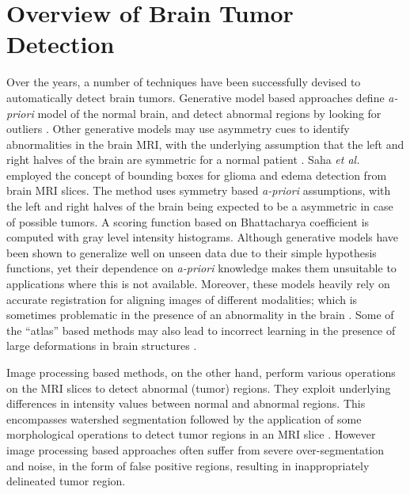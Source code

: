 \documentclass[journal,twocolumn]{IEEEtran}
\begin{document}
\section{Overview of Brain Tumor Detection}
\label{sec:previous_work}
Over the years, a number of techniques have been successfully devised to automatically detect brain tumors. Generative model based approaches define \emph{a-priori} model of the normal brain,  and detect abnormal regions by looking for outliers \cite{Prastawa2004_gen, Cuadra2004_atlas, Zacharaki2008_gen, Menze2010_gen}. Other generative models may use asymmetry cues to identify abnormalities in the brain MRI, with the underlying assumption that the left and right halves of the brain are symmetric for a normal patient \cite{Khotanlou2009_3d, Saha2012_quick}.
Saha \emph{et al.}  \cite{Saha2012_quick} employed the concept of bounding boxes for glioma and edema detection from brain MRI slices. The method uses symmetry based \emph{a-priori} assumptions, with  the left and right halves of the brain being expected to be a asymmetric in case of possible tumors. A  scoring function based on Bhattacharya coefficient is computed with gray level intensity histograms. Although generative models have been shown to generalize well on unseen data due to their simple hypothesis functions, yet their dependence on\emph{ a-priori} knowledge makes them unsuitable to applications where this is not available. Moreover, these models  heavily rely on accurate registration for aligning images of different modalities; which is sometimes problematic in the presence of an abnormality in the brain \cite{Parisot2012_joint}.  Some of the ``atlas'' based methods \cite{Cuadra2004_atlas} may also lead to incorrect learning in  the presence of  large deformations in  brain structures \cite{Khotanlou2009_3d}.

Image processing based methods, on the other hand,  perform various operations on the MRI slices to detect abnormal (tumor) regions. They exploit underlying differences in intensity values between normal and abnormal regions. This encompasses  watershed segmentation \cite{Mustaqeem2012efficient} followed by the application of some morphological operations to detect tumor regions in an MRI slice \cite{banerjee2016single,Sharma2014brain}. However  image processing based approaches often suffer from severe over-segmentation and noise, in the form of false positive regions, resulting in inappropriately delineated tumor region.
\end{document}
